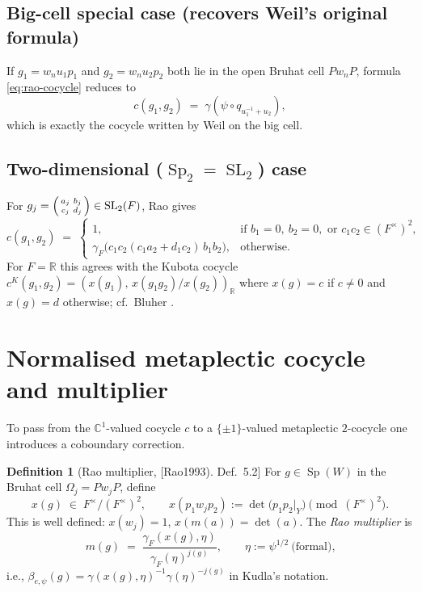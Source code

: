\documentclass[11pt,letterpaper]{article}
\newcommand{\Sp}{\operatorname{Sp}}
\newcommand{\SL}{\operatorname{SL}}
\newcommand{\F}{F}
\newcommand{\R}{\mathbb{R}}
\newcommand{\C}{\mathbb{C}}
\newcommand{\inv}{^{-1}}
\theoremstyle{plain}
\theoremstyle{definition}
\newtheorem{definition}[theorem]{Definition}
\begin{document}
\subsection*{Big-cell special case (recovers Weil's original formula)}

If $g_1 = w_n u_1 p_1$ and $g_2 = w_n u_2 p_2$ both lie in the open Bruhat cell $P w_n P$, formula \cref{eq:rao-cocycle} reduces to
\[
c(g_1,g_2) \;=\; \gamma\!\left(\psi\circ q_{u_1\inv + u_2}\right),
\]
which is exactly the cocycle written by Weil \cite[Thm.~3, p.~164]{Weil1964} on the big cell.

\subsection*{Two-dimensional ($\Sp_2 = \SL_2$) case}

For $g_j = \begin{psmallmatrix} a_j & b_j \\ c_j & d_j \end{psmallmatrix} \in \SL_2(\F)$, Rao \cite[Cor.~4.3]{Rao1993} gives
\begin{equation}\label{eq:rao-sl2}
c(g_1,g_2) \;=\;
\begin{cases}
1, & \text{if } b_1 = 0,\ b_2 = 0,\text{ or } c_1 c_2 \in (\F^\times)^2,\\[2pt]
\gamma_\F\bigl(c_1 c_2(c_1 a_2 + d_1 c_2)\,b_1 b_2\bigr), & \text{otherwise.}
\end{cases}
\end{equation}
For $\F = \R$ this agrees with the Kubota cocycle $c^K(g_1,g_2) = (x(g_1),\,x(g_1 g_2)/x(g_2))_\R$ where $x(g) = c$ if $c \ne 0$ and $x(g) = d$ otherwise; cf.\ Bluher \cite[Prop.~10(c)]{Bluher1996}.

\section{Normalised metaplectic cocycle and multiplier}
\label{sec:multiplier}

To pass from the $\C^1$-valued cocycle $c$ to a $\{\pm 1\}$-valued metaplectic $2$-cocycle one introduces a coboundary correction.

\begin{definition}[Rao multiplier, [Rao1993] Def.~5.2]
For $g \in \Sp(W)$ in the Bruhat cell $\Omega_j = P w_j P$, define
\[
x(g) \;\in\; \F^\times / (\F^\times)^2,\qquad
x(p_1 w_j p_2) := \det\bigl(p_1 p_2|_Y\bigr)\!\!\pmod{(\F^\times)^2}.
\]
This is well defined: $x(w_j) = 1$, $x(m(a)) = \det(a)$. The \emph{Rao multiplier} is
\begin{equation}\label{eq:multiplier}
m(g) \;=\; \frac{\gamma_\F(x(g),\eta)}{\gamma_\F(\eta)^{j(g)}},\qquad
\eta := \psi^{1/2}\ \text{(formal),}
\end{equation}
i.e., $\beta_{e,\psi}(g) = \gamma(x(g),\eta)\inv\gamma(\eta)^{-j(g)}$ in Kudla's notation.
\end{definition}
\end{document}
